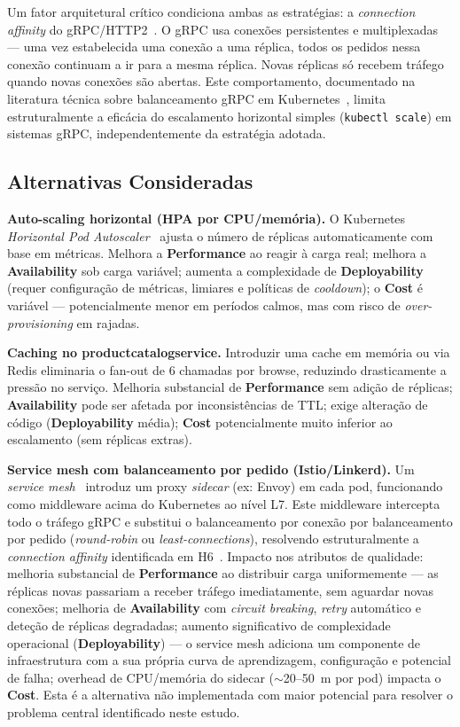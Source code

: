 \documentclass[acmsmall,screen=true,nonacm]{acmart}
\begin{document}
Um fator arquitetural crítico condiciona ambas as estratégias: a \textit{connection affinity} do gRPC/HTTP2~\cite{grpcloadbalancing,k8sgrpc}. O gRPC usa conexões persistentes e multiplexadas — uma vez estabelecida uma conexão a uma réplica, todos os pedidos nessa conexão continuam a ir para a mesma réplica. Novas réplicas só recebem tráfego quando novas conexões são abertas. Este comportamento, documentado na literatura técnica sobre balanceamento gRPC em Kubernetes~\cite{k8sgrpc}, limita estruturalmente a eficácia do escalamento horizontal simples (\texttt{kubectl scale}) em sistemas gRPC, independentemente da estratégia adotada.

\subsection{Alternativas Consideradas}

\textbf{Auto-scaling horizontal (HPA por CPU/memória).} O Kubernetes \textit{Horizontal Pod Autoscaler}~\cite{k8shpa} ajusta o número de réplicas automaticamente com base em métricas. Melhora a \textbf{Performance} ao reagir à carga real; melhora a \textbf{Availability} sob carga variável; aumenta a complexidade de \textbf{Deployability} (requer configuração de métricas, limiares e políticas de \textit{cooldown}); o \textbf{Cost} é variável — potencialmente menor em períodos calmos, mas com risco de \textit{over-provisioning} em rajadas.

\textbf{Caching no productcatalogservice.} Introduzir uma cache em memória ou via Redis eliminaria o fan-out de 6 chamadas por browse, reduzindo drasticamente a pressão no serviço. Melhoria substancial de \textbf{Performance} sem adição de réplicas; \textbf{Availability} pode ser afetada por inconsistências de TTL; exige alteração de código (\textbf{Deployability} média); \textbf{Cost} potencialmente muito inferior ao escalamento (sem réplicas extras).

\textbf{Service mesh com balanceamento por pedido (Istio/Linkerd).} Um \textit{service mesh}~\cite{servicemesh} introduz um proxy \textit{sidecar} (ex: Envoy) em cada pod, funcionando como middleware acima do Kubernetes ao nível L7. Este middleware intercepta todo o tráfego gRPC e substitui o balanceamento por conexão por balanceamento por pedido (\textit{round-robin} ou \textit{least-connections}), resolvendo estruturalmente a \textit{connection affinity} identificada em H6~\cite{k8sgrpc}. Impacto nos atributos de qualidade: melhoria substancial de \textbf{Performance} ao distribuir carga uniformemente — as réplicas novas passariam a receber tráfego imediatamente, sem aguardar novas conexões; melhoria de \textbf{Availability} com \textit{circuit breaking}, \textit{retry} automático e deteção de réplicas degradadas; aumento significativo de complexidade operacional (\textbf{Deployability}) — o service mesh adiciona um componente de infraestrutura com a sua própria curva de aprendizagem, configuração e potencial de falha; overhead de CPU/memória do sidecar ($\sim$20--50~m por pod) impacta o \textbf{Cost}. Esta é a alternativa não implementada com maior potencial para resolver o problema central identificado neste estudo.
\end{document}
